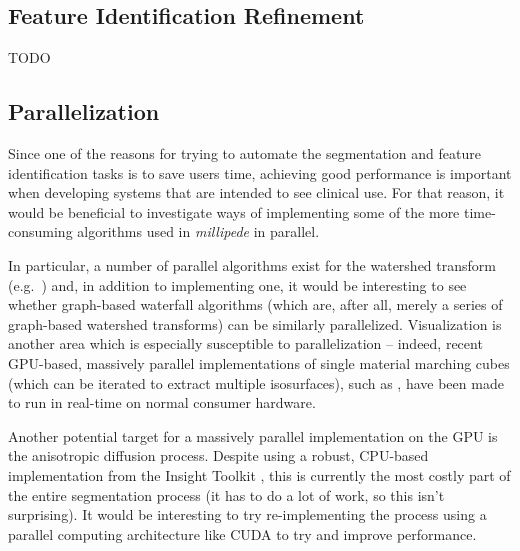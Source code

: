 \subsection{Feature Identification Refinement}

TODO

\subsection{Parallelization}

Since one of the reasons for trying to automate the segmentation and feature identification tasks is to save users time, achieving good performance is important when developing systems that are intended to see clinical use. For that reason, it would be beneficial to investigate ways of implementing some of the more time-consuming algorithms used in \emph{millipede} in parallel.

In particular, a number of parallel algorithms exist for the watershed transform (e.g.~\cite{bieniek97,moga98}) and, in addition to implementing one, it would be interesting to see whether graph-based waterfall algorithms (which are, after all, merely a series of graph-based watershed transforms) can be similarly parallelized. Visualization is another area which is especially susceptible to parallelization -- indeed, recent GPU-based, massively parallel implementations of single material marching cubes (which can be iterated to extract multiple isosurfaces), such as \cite{dyken08}, have been made to run in real-time on normal consumer hardware.

Another potential target for a massively parallel implementation on the GPU is the anisotropic diffusion process. Despite using a robust, CPU-based implementation from the Insight Toolkit \cite{itk}, this is currently the most costly part of the entire segmentation process (it has to do a lot of work, so this isn't surprising). It would be interesting to try re-implementing the process using a parallel computing architecture like CUDA \cite{cuda} to try and improve performance.
